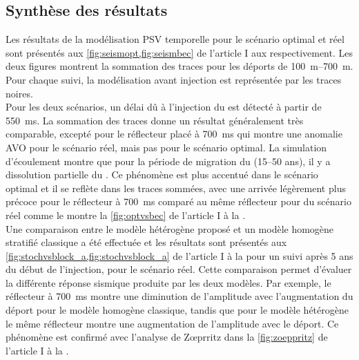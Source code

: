 \subsection{Synthèse des résultats}
Les résultats de la modélisation PSV temporelle pour le scénario optimal et réel sont présentés aux \cref{fig:seismopt,fig:seismbec} de l'article I aux  respectivement. Les deux figures montrent la sommation des traces pour les déports de \SIrange{100}{700}{\metre}. Pour chaque suivi, la modélisation avant injection est représentée par les traces noires.\\
Pour les deux scénarios, un délai dû à l'injection du  est détecté à partir de \SI{550}{\milli\second}. La sommation des traces donne un résultat généralement très comparable, excepté pour le réflecteur placé à \SI{700}{\milli\second} qui montre une anomalie AVO pour le scénario réel, mais pas pour le scénario optimal. La simulation d'écoulement montre que pour la période de migration du  (\numrange{15}{50} ans), il y a dissolution partielle du . Ce phénomène est plus accentué dans le scénario optimal et il se reflète dans les traces sommées, avec une arrivée légèrement plus précoce pour le réflecteur à \SI{700}{\milli\second} comparé au même réflecteur pour du scénario réel comme le montre la \cref{fig:optvsbec} de l'article I à la .\\
Une comparaison entre le modèle hétérogène proposé et un modèle homogène stratifié classique a été effectuée et les résultats sont présentés aux \cref{fig:stochvsblock_a,fig:stochvsblock_a} de l'article I à la  pour un suivi après \num{5} ans du début de l’injection, pour le scénario réel. Cette comparaison permet d’évaluer la différente réponse sismique produite par les deux modèles. Par exemple, le réflecteur à \SI{700}{\milli\second} montre une diminution de l'amplitude avec l'augmentation du déport pour le modèle homogène classique, tandis que pour le modèle hétérogène le même réflecteur montre une augmentation de l'amplitude avec le déport. Ce phénomène est confirmé avec l’analyse de Zœprritz \citep{Aki1980} dans la \cref{fig:zoeppritz} de l'article I à la .